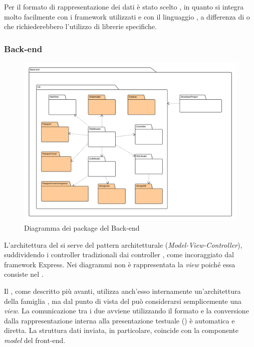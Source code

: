 Per il formato di rappresentazione dei dati è stato scelto , in quanto si integra molto facilmente con i framework utilizzati e con il linguaggio , a differenza di  o  che richiederebbero l'utilizzo di librerie specifiche.


\subsubsection{Back-end}

\begin{figure}[H]
\centering
\includegraphics[width=\textwidth]{uml/Back-end-Diagramma dei Packages.png}
\caption{Diagramma dei package del Back-end}
\end{figure}

L'architettura del  si serve del pattern architetturale  (\textit{Model-View-Controller}), suddividendo i controller tradizionali dai controller , come incoraggiato dal framework Express. Nei diagrammi non è rappresentata la \textit{view} poiché essa consiste nel .

Il , come descritto più avanti, utilizza anch'esso internamente un'architettura della famiglia , ma dal punto di vista del  può considerarsi semplicemente una \textit{view}. La comunicazione tra i due avviene utilizzando il formato  e la conversione dalla rappresentazione interna alla presentazione testuale () è automatica e diretta. La struttura dati inviata, in particolare, coincide con la componente \textit{model} del front-end.

